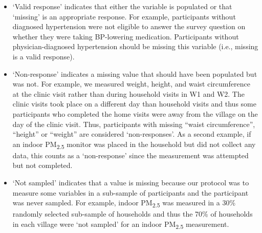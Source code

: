 \documentclass[
  letterpaper,
  DIV=11,
  numbers=noendperiod]{scrartcl}
\begin{document}
\begin{itemize}
\item
  `Valid response' indicates that either the variable is populated or
  that `missing' is an appropriate response. For example, participants
  without diagnosed hypertension were not eligible to answer the survey
  question on whether they were taking BP-lowering medication.
  Participants without physician-diagnosed hypertension should be
  missing this variable (i.e., missing is a valid response).
\item
  `Non-response' indicates a missing value that should have been
  populated but was not. For example, we measured weight, height, and
  waist circumference at the clinic visit rather than during household
  visits in W1 and W2. The clinic visits took place on a different day
  than household visits and thus some participants who completed the
  home visits were away from the village on the day of the clinic visit.
  Thus, participants with missing ``waist circumference'', ``height'' or
  ``weight'' are considered `non-responses'. As a second example, if an
  indoor PM\textsubscript{2.5} monitor was placed in the household but
  did not collect any data, this counts as a `non-response' since the
  measurement was attempted but not completed.
\item
  `Not sampled' indicates that a value is missing because our protocol
  was to measure some variables in a sub-sample of participants and the
  participant was never sampled. For example, indoor
  PM\textsubscript{2.5} was measured in a 30\% randomly selected
  sub-sample of households and thus the 70\% of households in each
  village were `not sampled' for an indoor PM\textsubscript{2.5}
  measurement.
\end{itemize}
\end{document}
